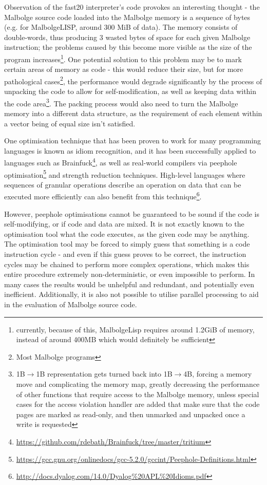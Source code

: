 \par Observation of the fast20 interpreter's code provokes an interesting thought - the Malbolge source code loaded into the Malbolge memory is a sequence of bytes (e.g. for MalbolgeLISP, around 300 MiB of data). The memory consists of double-words, thus producing 3 wasted bytes of space for each given Malbolge instruction; the problems caused by this become more visible as the size of the program increases\footnote{currently, because of this, MalbolgeLisp requires around 1.2GiB of memory, instead of around 400MB which would definitely be sufficient}. One potential solution to this problem may be to mark certain areas of memory as code - this would reduce their size, but for more pathological cases\footnote{Most Malbolge programs}, the performance would degrade significantly by the process of unpacking the code to allow for self-modification, as well as keeping data within the code area\footnote{1B$\rightarrow$1B representation gets turned back into 1B$\rightarrow$4B, forcing a memory move and complicating the memory map, greatly decreasing the performance of other functions that require access to the Malbolge memory, unless special cases for the access violation handler are added that make sure that the code pages are marked as read-only, and then unmarked and unpacked once a write is requested}. The packing process would also need to turn the Malbolge memory into a different data structure, as the requirement of each element within a vector being of equal size isn't satisfied.

\par One optimisation technique that has been proven to work for many programming languages is known as idiom recognition, and it has been successfully applied to languages such as Brainfuck\footnote{\url{https://github.com/rdebath/Brainfuck/tree/master/tritium}}, as well as real-world compilers via peephole optimisation\footnote{\url{https://gcc.gnu.org/onlinedocs/gcc-5.2.0/gccint/Peephole-Definitions.html}} and strength reduction techniques. High-level languages where sequences of granular operations describe an operation on data that can be executed more efficiently can also benefit from this technique\footnote{\url{http://docs.dyalog.com/14.0/Dyalog\%20APL\%20Idioms.pdf}}.

\par However, peephole optimisations cannot be guaranteed to be sound if the code is self-modifying, or if code and data are mixed. It is not exactly known to the optimisation tool what the code executes, as the given code may be anything. The optimisation tool may be forced to simply guess that something is a code instruction cycle - and even if this guess proves to be correct, the instruction cycles may be chained to perform more complex operations, which makes this entire procedure extremely non-deterministic, or even impossible to perform. In many cases the results would be unhelpful and redundant, and potentially even inefficient. Additionally, it is also not possible to utilise parallel processing to aid in the evaluation of Malbolge source code.

